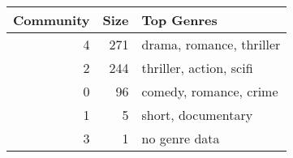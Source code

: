 \begin{tabular}{rrl}
\toprule
Community & Size & Top Genres \\
\midrule
4 & 271 & drama, romance, thriller \\
2 & 244 & thriller, action, scifi \\
0 & 96 & comedy, romance, crime \\
1 & 5 & short, documentary \\
3 & 1 & no genre data \\
\bottomrule
\end{tabular}
